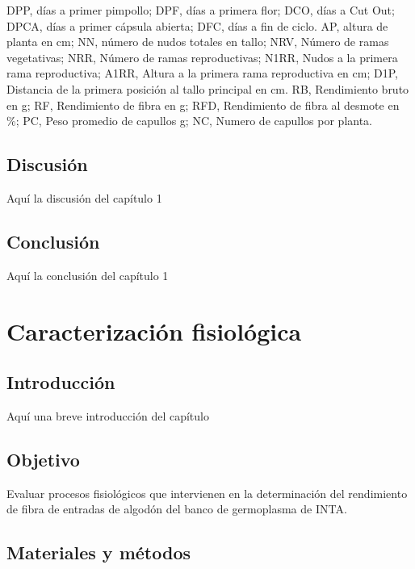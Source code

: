 \documentclass[12pt,oneside]{reedthesis}
\begin{document}
\begin{landscape}
\begin{table}[!h]
{\begin{threeparttable}
\begin{tablenotes}[para]
\item DPP, días a primer pimpollo; DPF, días a primera flor; DCO, días a Cut Out; DPCA, días a primer cápsula abierta; DFC, días a fin de ciclo. AP, altura de planta en cm; NN, número de nudos totales en tallo; NRV, Número de ramas vegetativas; NRR, Número de ramas reproductivas; N1RR, Nudos a la primera rama reproductiva; A1RR, Altura a la primera rama reproductiva en cm; D1P, Distancia de la primera posición al tallo principal en cm. RB, Rendimiento bruto en g; RF, Rendimiento de fibra en g; RFD, Rendimiento de fibra al desmote en \%; PC, Peso promedio de capullos g; NC, Numero de capullos por planta.
\end{tablenotes}
\end{threeparttable}}
\end{table}
\end{landscape}

\section{Discusión}\label{discusiuxf3n}

Aquí la discusión del capítulo 1

\section{Conclusión}\label{conclusiuxf3n}

Aquí la conclusión del capítulo 1

\chapter{Caracterización fisiológica}\label{math-sci}

\section{Introducción}\label{introducciuxf3n-2}

Aquí una breve introducción del capítulo

\section{Objetivo}\label{objetivo-1}

Evaluar procesos fisiológicos que intervienen en la determinación del rendimiento de fibra de entradas de algodón del banco de germoplasma de INTA.

\section{Materiales y métodos}\label{materiales-y-muxe9todos-1}
\end{document}

